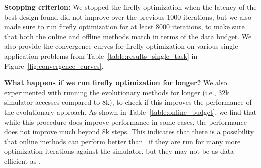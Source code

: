 {\textbf{Stopping criterion:} We stopped the firefly optimization when the latency of the best design found did not improve over the previous 1000 iterations, but we also made sure to run firefly optimization for at least 8000 iterations, to make sure that both the online and offline methods match in terms of the data budget. We also provide the convergence curves for firefly optimization on various single-application problems from Table~\ref{table:results_single_task} in Figure~\ref{fig:convergence_curves}.}

{\textbf{What happens if we run firefly optimization for longer?} We also experimented with running the evolutionary methods for longer (i.e., 32k simulator accesses compared to 8k), to check if this improves the performance of the evolutionary approach. As shown in Table~\ref{table:online_budget}, we find that while this procedure does improve performance in some cases, the performance does not improve much beyond 8k steps. This indicates that there is a possibility that online methods can perform better than \primemethodname\ if they are run for many more optimization iterations against the simulator, but they may not be as data-efficient as \primemethodname.}

\begin{table}[t!]
\small
\centering
\vspace*{0.0cm}
\caption{\label{table:online_budget}}
\vspace{-0.3cm}
\end{table}
%

